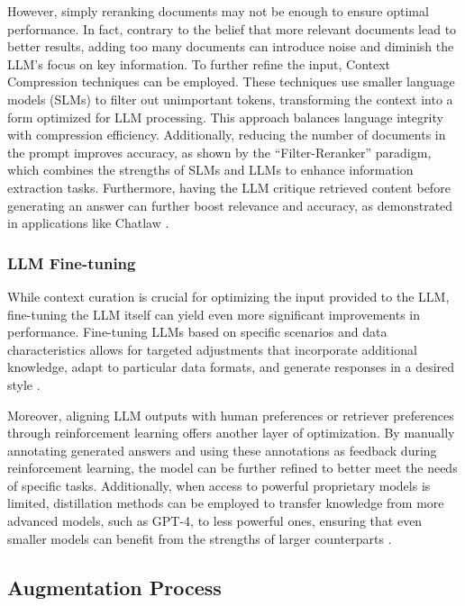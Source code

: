 However, simply reranking documents may not be enough to ensure optimal performance. In fact, contrary to the belief that more relevant documents lead to better results, adding too many documents can introduce noise and diminish the LLM’s focus on key information. To further refine the input, Context Compression techniques can be employed. These techniques use smaller language models (SLMs) to filter out unimportant tokens, transforming the context into a form optimized for LLM processing. This approach balances language integrity with compression efficiency. Additionally, reducing the number of documents in the prompt improves accuracy, as shown by the “Filter-Reranker” paradigm, which combines the strengths of SLMs and LLMs to enhance information extraction tasks. Furthermore, having the LLM critique retrieved content before generating an answer can further boost relevance and accuracy, as demonstrated in applications like Chatlaw \cite{gao2023retrieval, cui2023chatlaw}.

\subsubsection{LLM Fine-tuning}

While context curation is crucial for optimizing the input provided to the LLM, fine-tuning the LLM itself can yield even more significant improvements in performance. Fine-tuning LLMs based on specific scenarios and data characteristics allows for targeted adjustments that incorporate additional knowledge, adapt to particular data formats, and generate responses in a desired style \cite{du2022retrieval}.

Moreover, aligning LLM outputs with human preferences or retriever preferences through reinforcement learning offers another layer of optimization. By manually annotating generated answers and using these annotations as feedback during reinforcement learning, the model can be further refined to better meet the needs of specific tasks. Additionally, when access to powerful proprietary models is limited, distillation methods can be employed to transfer knowledge from more advanced models, such as GPT-4, to less powerful ones, ensuring that even smaller models can benefit from the strengths of larger counterparts \cite{shi2023dual}.

\subsection{Augmentation Process}

